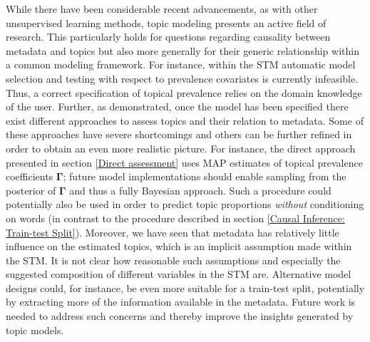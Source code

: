 While there have been considerable recent advancements, as with other unsupervised learning methods, topic modeling presents an active field of research. This particularly holds for questions regarding causality between metadata and topics but also more generally for their generic relationship within a common modeling framework. For instance, within the STM automatic model selection and testing with respect to prevalence covariates is currently infeasible. Thus, a correct specification of topical prevalence relies on the domain knowledge of the user. Further, as demonstrated, once the model has been specified there exist different approaches to assess topics and their relation to metadata. Some of these approaches have severe shortcomings and others can be further refined in order to obtain an even more realistic picture. For instance, the direct approach presented in section \ref{Direct assessment} uses MAP estimates of topical prevalence coefficients $\boldsymbol{\Gamma}$; future model implementations should enable sampling from the posterior of $\boldsymbol{\Gamma}$ and thus a fully Bayesian approach. Such a procedure could potentially also be used in order to predict topic proportions \textit{without} conditioning on words (in contrast to the procedure described in section \ref{Causal Inference: Train-test Split}). Moreover, we have seen that metadata has relatively little influence on the estimated topics, which is an implicit assumption made within the STM. It is not clear how reasonable such assumptions and especially the suggested composition of different variables in the STM are.
Alternative model designs could, for instance, be even more suitable for a train-test split, potentially by extracting more of the information available in the metadata. Future work is needed to address such concerns and thereby improve the insights generated by topic models.


